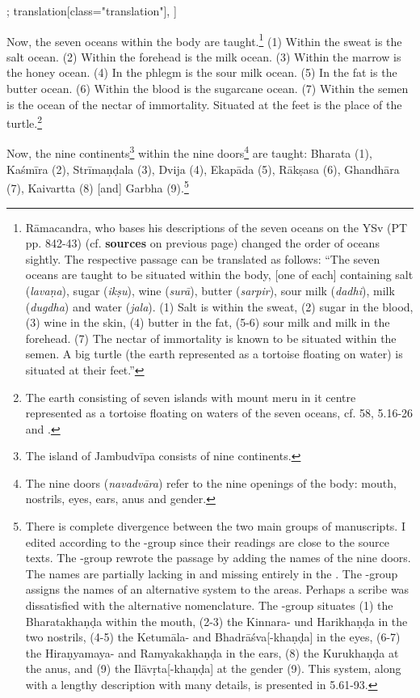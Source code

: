 \begin{alignment}[
  texts=edition[class="edition"];
  translation[class="translation"],
  ]
\begin{translation}
\begin{tlate}[p37_01]
Now, the seven oceans within the body are taught.\footnote{Rāmacandra, who bases his descriptions of the seven oceans on the YSv (PT pp. 842-43) (cf. \textbf{sources} on previous page) changed the order of oceans sightly. The respective passage can be translated as follows: ``The seven oceans are taught to be situated within the body, [one of each] containing salt (\textit{lavaṇa}), sugar (\textit{ikṣu}), wine (\textit{surā}), butter (\textit{sarpir}), sour milk (\textit{dadhi}), milk (\textit{dugdha}) and water (\textit{jala}). (1) Salt is within the sweat, (2) sugar in the blood, (3) wine in the skin, (4) butter in the fat, (5-6) sour milk and milk in the forehead. (7) The nectar of immortality is known to be situated within the semen. A big turtle (the earth represented as a tortoise floating on water) is situated at their feet.''} (1) Within the sweat is the salt ocean. (2) Within the forehead is the milk ocean. (3) Within the marrow is the honey ocean. (4) In the phlegm is the sour milk ocean. (5) In the fat is the butter ocean. (6) Within the blood is the sugarcane ocean. (7) Within the semen is the ocean of the nectar of immortality. Situated at the feet is the place of the turtle.\footnote{The earth consisting of seven islands with mount meru in it centre represented as a tortoise floating on waters of the seven oceans, cf.  58,  5.16-26 and \citeauthor[2009:354]{bryant2009}.}
\end{tlate}
\begin{tlate}[p38_01]
  Now, the nine continents\footnote{The island of Jambudvīpa consists of nine continents.} within the nine doors\footnote{The nine doors (\textit{navadvāra}) refer to the nine openings of the body: mouth, nostrils, eyes, ears, anus and gender.} are taught: Bharata (1), Kaśmīra (2), Strīmaṇḍala (3), Dvija (4), Ekapāda (5), Rākṣasa (6), Ghandhāra (7), Kaivartta (8) [and] Garbha (9).\footnote{There is complete divergence between the two main groups of manuscripts. I edited according to the \alpha-group since their readings are close to the source texts. The \beta-group rewrote the passage by adding the names of the nine doors. The names are partially lacking in  and missing entirely in the . The \beta-group assigns the names of an alternative system to the areas. Perhaps a scribe was dissatisfied with the alternative nomenclature. The \beta-group situates (1) the Bharatakhaṇḍa within the mouth, (2-3) the Kinnara- und Harikhaṇḍa in the two nostrils, (4-5) the Ketumāla- and Bhadrāśva[-khaṇḍa] in the eyes, (6-7) the Hiraṇyamaya- and Ramyakakhaṇḍa in the ears, (8) the Kurukhaṇḍa at the anus, and (9) the Ilāvṛta[-khaṇḍa] at the gender (9). This system, along with a lengthy description with many details, is presented in  5.61-93.}
  \flushpage
  \end{tlate}
  \end{translation}
\end{alignment}
